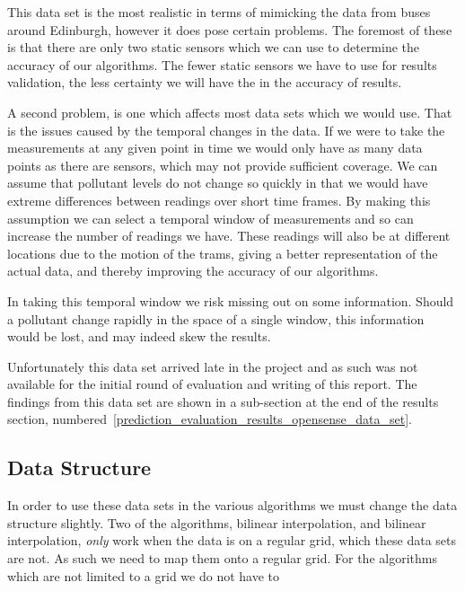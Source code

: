 
				This data set is the most realistic in terms of mimicking the data from buses around Edinburgh, however it does pose certain problems. The foremost of these is that there are only two static sensors which we can use to determine the accuracy of our algorithms. The fewer static sensors we have to use for results validation, the less certainty we will have the in the accuracy of results.

				A second problem, is one which affects most data sets which we would use. That is the issues caused by the temporal changes in the data. If we were to take the measurements at any given point in time we would only have as many data points as there are sensors, which may not provide sufficient coverage. We can assume that pollutant levels do not change so quickly in that we would have extreme differences between readings over short time frames. By making this assumption we can select a temporal window of measurements and so can increase the number of readings we have. These readings will also be at different locations due to the motion of the trams, giving a better representation of the actual data, and thereby improving the accuracy of our algorithms. 

				In taking this temporal window we risk missing out on some information. Should a pollutant change rapidly in the space of a single window, this information would be lost, and may indeed skew the results. 

				Unfortunately this data set arrived late in the project and as such was not available for the initial round of evaluation and writing of this report. The findings from this data set are shown in a sub-section at the end of the results section, numbered~\ref{prediction_evaluation_results_opensense_data_set}.

		\subsection{Data Structure}\label{prediction_evaluation_methodology_data_structure}
			
			In order to use these data sets in the various algorithms we must change the data structure slightly. Two of the algorithms, bilinear interpolation, and bilinear interpolation, \emph{only} work when the data is on a regular grid, which these data sets are not. As such we need to map them onto a regular grid. For the algorithms which are not limited to a grid we do not have to


